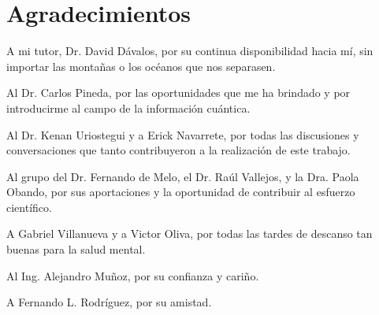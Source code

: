 \section*{Agradecimientos}

A mi tutor, Dr. David Dávalos, por su continua disponibilidad hacia mí, sin importar las montañas o los océanos que nos separasen. 

\vspace{0.2cm}

Al Dr. Carlos Pineda, por las oportunidades que me ha brindado y por introducirme al campo de la información cuántica.

\vspace{0.2cm}

Al Dr. Kenan Uriostegui y a Erick Navarrete, por todas las discusiones y conversaciones que tanto contribuyeron a la realización de este trabajo. 

\vspace{0.2cm}

Al grupo del Dr. Fernando de Melo, el Dr. Raúl Vallejos, y la Dra. Paola Obando, por sus aportaciones y la oportunidad de contribuir al esfuerzo científico.

\vspace{0.2cm}

A Gabriel Villanueva y a Victor Oliva, por todas las tardes de descanso tan buenas para la salud mental.

\vspace{0.2cm}

Al Ing. Alejandro Muñoz, por su confianza y cariño. 

\vspace{0.2cm}

A Fernando L. Rodríguez, por su amistad.